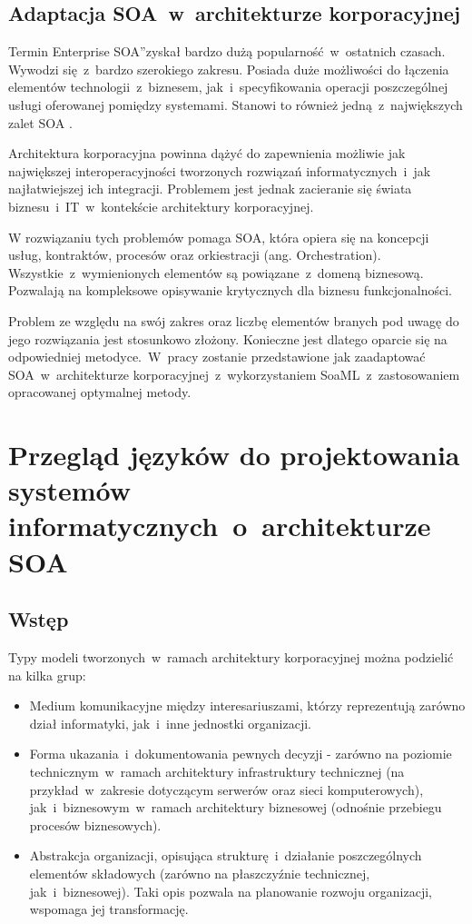 \section{Adaptacja SOA~w~architekturze korporacyjnej}
Termin \quotedblbase Enterprise SOA\textquotedblright zyskał bardzo dużą popularność~w~ostatnich czasach. Wywodzi się~z~bardzo szerokiego zakresu. Posiada duże możliwości do łączenia elementów technologii~z~biznesem, jak~i~specyfikowania operacji poszczególnej usługi oferowanej pomiędzy systemami. Stanowi to również jedną~z~największych zalet SOA \cite{EntSOACoryCanSoaML}. 

Architektura korporacyjna powinna dążyć do zapewnienia możliwie jak największej interoperacyjności tworzonych rozwiązań informatycznych~i~jak najłatwiejszej ich integracji. Problemem jest jednak zacieranie się świata biznesu~i~IT~w~kontekście architektury korporacyjnej.

W rozwiązaniu tych problemów pomaga SOA, która opiera się na koncepcji usług, kontraktów, procesów oraz orkiestracji (ang. Orchestration). Wszystkie~z~wymienionych elementów są powiązane~z~domeną biznesową. Pozwalają na kompleksowe opisywanie krytycznych dla biznesu funkcjonalności. 

Problem ze względu na swój zakres oraz liczbę elementów branych pod uwagę do jego rozwiązania jest stosunkowo złożony. Konieczne jest dlatego oparcie się na odpowiedniej metodyce.~W~pracy zostanie przedstawione jak zaadaptować SOA~w~architekturze korporacyjnej~z~wykorzystaniem SoaML~z~zastosowaniem opracowanej optymalnej metody.

\chapter{Przegląd języków do projektowania systemów informatycznych~o~architekturze SOA}

\section{Wstęp}
Typy modeli tworzonych~w~ramach architektury korporacyjnej można podzielić na kilka grup:
\begin{itemize}
\item{Medium komunikacyjne między interesariuszami, którzy reprezentują zarówno dział informatyki, jak~i~inne jednostki organizacji.}
\item{Forma ukazania~i~dokumentowania pewnych decyzji - zarówno na poziomie technicznym~w~ramach architektury infrastruktury technicznej (na przykład~w~zakresie dotyczącym serwerów oraz sieci komputerowych), jak~i~biznesowym~w~ramach architektury biznesowej (odnośnie przebiegu procesów biznesowych).}
\item{Abstrakcja organizacji, opisująca strukturę~i~działanie poszczególnych elementów składowych (zarówno na płaszczyźnie technicznej, jak~i~biznesowej). Taki opis pozwala na planowanie rozwoju organizacji, wspomaga jej transformację.}
\end{itemize}

